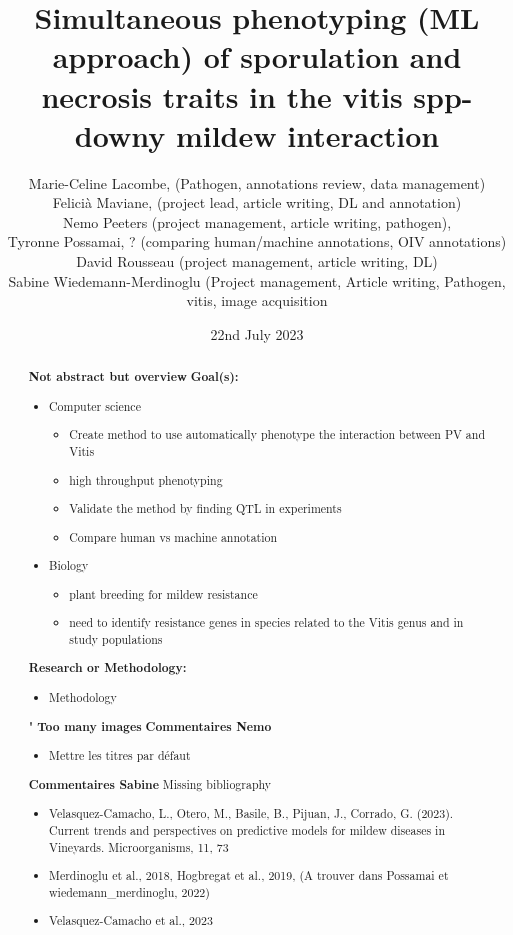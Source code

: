 \documentclass[english]{article}
\title{Simultaneous phenotyping (ML approach) of sporulation and necrosis traits in the vitis spp-downy mildew interaction}
\date{22nd July 2023}
\author{
Marie-Celine Lacombe, (Pathogen, annotations review, data management)\\
Felicià Maviane, (project lead, article writing, DL and annotation)\\
Nemo Peeters (project management, article writing, pathogen),\\
Tyronne Possamai, ? (comparing human/machine annotations, OIV annotations)\\
David Rousseau (project management, article writing, DL)\\
Sabine Wiedemann-Merdinoglu (Project management, Article writing, Pathogen, vitis, image acquisition\\
}
\begin{document}
\maketitle

\begin{changemargin}{60pt}{60pt}
	\begin{abstract}
		\textbf{Not abstract but overview} \newline
		\textbf{Goal(s):}
		\begin{itemize}
			\item Computer science
			      \begin{itemize}
				      \item Create method to use automatically phenotype the interaction between PV and Vitis
				      \item high throughput phenotyping
				      \item Validate the method by finding QTL in  experiments
				      \item Compare human vs machine annotation
			      \end{itemize}
			\item Biology
			      \begin{itemize}
				      \item plant breeding for mildew resistance
				      \item need to identify resistance genes in species related to the Vitis genus and in study populations
			      \end{itemize}
		\end{itemize}
		\textbf{Research or Methodology:}
		\begin{itemize}
			\item Methodology
		\end{itemize}"
		\textbf{Too many images}
            \textbf{Commentaires Nemo}
            \begin{itemize}
                \item Mettre les titres par défaut
            \end{itemize}
            \textbf{Commentaires Sabine}
            Missing bibliography
            \begin{itemize}
            	\item Velasquez-Camacho, L., Otero, M., Basile, B., Pijuan, J., Corrado, G. (2023). Current trends and perspectives on predictive models for mildew diseases in Vineyards. Microorganisms, 11, 73
            	\item Merdinoglu et al., 2018, Hogbregat et al., 2019, (A trouver dans Possamai et wiedemann\_merdinoglu, 2022)
            	\item Velasquez-Camacho et al., 2023
            \end{itemize}

	\end{abstract}
\end{changemargin}
\end{document}

